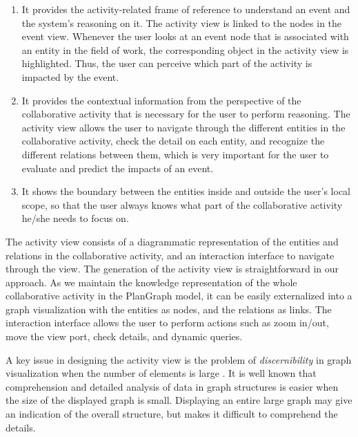 \begin{enumerate}
	\item It provides the activity-related frame of reference to understand an event and the system's reasoning on it. The activity view is linked to the nodes in the event view. Whenever the user looks at an event node that is associated with an entity in the field of work, the corresponding object in the activity view is highlighted. Thus, the user can perceive which part of the activity is impacted by the event.
	\item It provides the contextual information from the perspective of the collaborative activity that is necessary for the user to perform reasoning. The activity view allows the user to navigate through the different entities in the collaborative activity, check the detail on each entity, and recognize the different relations between them, which is very important for the user to evaluate and predict the impacts of an event.
	\item It shows the boundary between the entities inside and outside the user's local scope, so that the user always knows what part of the collaborative activity he/she needs to focus on.
\end{enumerate}

The activity view consists of a diagrammatic representation of the entities and relations in the collaborative activity, and an interaction interface to navigate through the view. The generation of the activity view is straightforward in our approach. As we maintain the knowledge representation of the whole collaborative activity in the PlanGraph model, it can be easily externalized into a graph visualization with the entities as nodes, and the relations as links. The interaction interface allows the user to perform actions such as zoom in/out, move the view port, check details, and dynamic queries.

A key issue in designing the activity view is the problem of \emph{discernibility} in graph visualization when the number of elements is large \cite{Herman2000}. It is well known that comprehension and detailed analysis of data in graph structures is easier when the size of the displayed graph is small. Displaying an entire large graph may give an indication of the overall structure, but makes it difficult to comprehend the details. 

